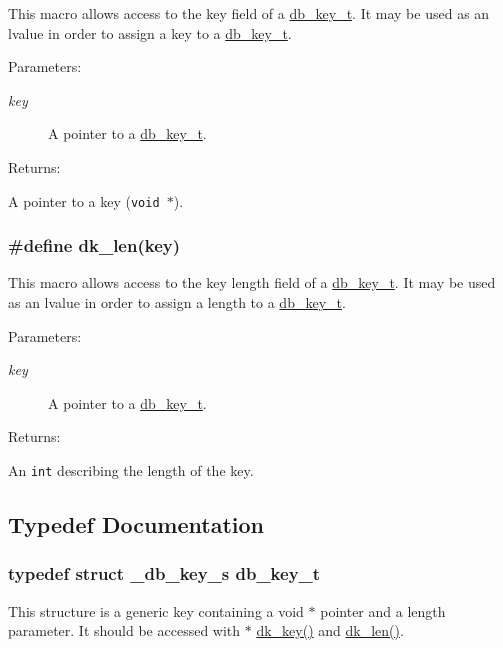 This macro allows access to the key field of a \hyperlink{group__dbprim_a0}{db\_\-key\_\-t}. It may be used as an lvalue in order to assign a key to a \hyperlink{group__dbprim_a0}{db\_\-key\_\-t}.\begin{Desc}
\item[Parameters: ]\par
\begin{description}
\item[{\em 
key}]A pointer to a \hyperlink{group__dbprim_a0}{db\_\-key\_\-t}. \end{description}
\end{Desc}
\begin{Desc}
\item[Returns: ]\par
A pointer to a key ({\tt void $\ast$}). \end{Desc}
\hypertarget{group__dbprim_a3}{
\subsubsection[dk\_\-len]{\setlength{\rightskip}{0pt plus 5cm}\#define dk\_\-len(key)}}
\label{group__dbprim_a3}


This macro allows access to the key length field of a \hyperlink{group__dbprim_a0}{db\_\-key\_\-t}. It may be used as an lvalue in order to assign a length to a \hyperlink{group__dbprim_a0}{db\_\-key\_\-t}.\begin{Desc}
\item[Parameters: ]\par
\begin{description}
\item[{\em 
key}]A pointer to a \hyperlink{group__dbprim_a0}{db\_\-key\_\-t}. \end{description}
\end{Desc}
\begin{Desc}
\item[Returns: ]\par
An {\tt int} describing the length of the key. \end{Desc}


\subsection{Typedef Documentation}
\hypertarget{group__dbprim_a0}{
\subsubsection[db\_\-key\_\-t]{\setlength{\rightskip}{0pt plus 5cm}typedef struct \_\-db\_\-key\_\-s db\_\-key\_\-t}}
\label{group__dbprim_a0}


This structure is a generic key containing a void $\ast$ pointer and a length parameter. It should be accessed with $\ast$ \hyperlink{group__dbprim_a2}{dk\_\-key()} and \hyperlink{group__dbprim_a3}{dk\_\-len()}. 